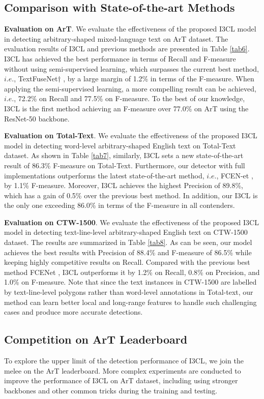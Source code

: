 \subsection{Comparison with State-of-the-art Methods}

\noindent\textbf{Evaluation on ArT}. We evaluate the effectiveness of the proposed I3CL model in detecting arbitrary-shaped mixed-language text on ArT dataset. The evaluation results of I3CL and previous methods are presented in Table \ref{tab6}. I3CL has achieved the best performance in terms of Recall and F-measure without using semi-supervised learning, which surpasses the current best method, $i.e.$, TextFuseNet$\dag$ \citep{textfusenet}, by a large margin of 1.2\% in terms of the F-measure. When applying the semi-supervised learning, a more compelling result can be achieved, $i.e.$, 72.2\% on Recall and 77.5\% on F-measure. To the best of our knowledge, I3CL is the first method achieving an F-measure over 77.0\% on ArT using the ResNet-50 backbone.

\noindent\textbf{Evaluation on Total-Text}. We evaluate the effectiveness of the proposed I3CL model in detecting word-level arbitrary-shaped English text on Total-Text dataset. As shown in Table \ref{tab7}, similarly, I3CL sets a new state-of-the-art result of 86.3\% F-measure on Total-Text. Furthermore, our detector with full implementations outperforms the latest state-of-the-art method, $i.e.$, FCEN-et \citep{fcenet}, by 1.1\% F-measure. Moreover, I3CL achieves the highest Precision of 89.8\%, which has a gain of 0.5\% over the previous best method. In addition, our I3CL is the only one exceeding 86.0\% in terms of the F-measure in all contenders.

\noindent\textbf{Evaluation on CTW-1500}. We evaluate the effectiveness of the proposed I3CL model in detecting text-line-level arbitrary-shaped English text on CTW-1500 dataset. The results are summarized in Table \ref{tab8}. As can be seen, our model achieves the best results with Precision of 88.4\% and F-measure of 86.5\% while keeping highly competitive results on Recall. Compared with the previous best method FCENet \citep{fcenet}, I3CL outperforms it by 1.2\% on Recall, 0.8\% on Precision, and 1.0\% on F-measure. Note that since the text instances in CTW-1500 are labelled by text-line-level polygons rather than word-level annotations in Total-text, our method can learn better local and long-range features to handle such challenging cases and produce more accurate detections.

\subsection{Competition on ArT Leaderboard}
To explore the upper limit of the detection performance of I3CL, we join the melee on the ArT leaderboard. More complex experiments are conducted to improve the performance of I3CL on ArT dataset, including using stronger backbones and other common tricks during the training and testing.

